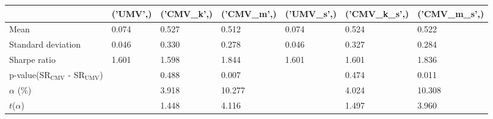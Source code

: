 \begin{tabular}{lllllll}
\toprule
 & ('UMV',) & ('CMV_k',) & ('CMV_m',) & ('UMV_s',) & ('CMV_k_s',) & ('CMV_m_s',) \\
\midrule
Mean & 0.074 & 0.527 & 0.512 & 0.074 & 0.524 & 0.522 \\
Standard deviation & 0.046 & 0.330 & 0.278 & 0.046 & 0.327 & 0.284 \\
Sharpe ratio & 1.601 & 1.598 & 1.844 & 1.601 & 1.601 & 1.836 \\
p-value(SR$_{\text{CMV}}$ - SR$_{\text{UMV}}$) &  & 0.488 & 0.007 &  & 0.474 & 0.011 \\
$\alpha$ (\%) &  & 3.918 & 10.277 &  & 4.024 & 10.308 \\
$t$($\alpha$) &  & 1.448 & 4.116 &  & 1.497 & 3.960 \\
\bottomrule
\end{tabular}

